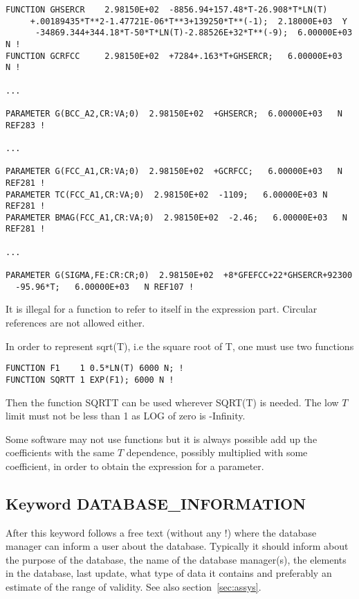 \documentclass[12pt]{article}
\begin{document}
\begin{verbatim}
FUNCTION GHSERCR    2.98150E+02  -8856.94+157.48*T-26.908*T*LN(T)
     +.00189435*T**2-1.47721E-06*T**3+139250*T**(-1);  2.18000E+03  Y
      -34869.344+344.18*T-50*T*LN(T)-2.88526E+32*T**(-9);  6.00000E+03  N !
FUNCTION GCRFCC     2.98150E+02  +7284+.163*T+GHSERCR;   6.00000E+03   N !

...

PARAMETER G(BCC_A2,CR:VA;0)  2.98150E+02  +GHSERCR;  6.00000E+03   N REF283 !

...

PARAMETER G(FCC_A1,CR:VA;0)  2.98150E+02  +GCRFCC;   6.00000E+03   N REF281 !
PARAMETER TC(FCC_A1,CR:VA;0)  2.98150E+02  -1109;   6.00000E+03 N   REF281 !
PARAMETER BMAG(FCC_A1,CR:VA;0)  2.98150E+02  -2.46;   6.00000E+03   N REF281 !

...

PARAMETER G(SIGMA,FE:CR:CR;0)  2.98150E+02  +8*GFEFCC+22*GHSERCR+92300
  -95.96*T;   6.00000E+03   N REF107 !

\end{verbatim}

It is illegal for a function to refer to itself in the expression
part.  Circular references are not allowed either.

In order to represent sqrt(T), i.e the square root of T, one must use
two functions

\begin{verbatim}
FUNCTION F1    1 0.5*LN(T) 6000 N; !
FUNCTION SQRTT 1 EXP(F1); 6000 N !
\end{verbatim}

Then the function SQRTT can be used wherever SQRT(T) is needed.  The
low $T$ limit must not be less than 1 as LOG of zero is -Infinity.

Some software may not use functions but it is always possible add up
the coefficients with the same $T$ dependence, possibly multiplied
with some coefficient, in order to obtain the expression for a
parameter.

\subsection{Keyword DATABASE\_INFORMATION}\label{sec:info}

After this keyword follows a free text (without any !) where the
database manager can inform a user about the database.  Typically it
should inform about the purpose of the database, the name of the
database manager(s), the elements in the database, last update, what
type of data it contains and preferably an estimate of the range of
validity.  See also section~\ref{sec:assys}.
\end{document}
